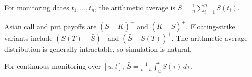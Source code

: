 For monitoring dates $t_1,\ldots,t_n$, the arithmetic average is
$\bar{S}=\frac{1}{n}\sum_{i=1}^n S(t_i)$.

Asian call and put payoffs are $(\bar{S}-K)^+$ and $(K-\bar{S})^+$. Floating-strike variants include $(S(T)-\bar{S})^+$ and $(\bar{S}-S(T))^+$. The arithmetic average distribution is generally intractable, so simulation is natural.

For continuous monitoring over $[u,t]$,
$\bar{S}=\frac{1}{t-u}\int_u^tS(\tau)\,d\tau$.













